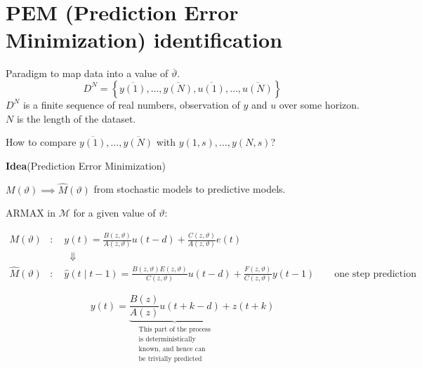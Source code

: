 \section{PEM (Prediction Error Minimization) identification}

Paradigm to map data into a value of $\overline{\vartheta}$.
$$
	D^N=\left\{\overline{y(1)},\ldots,\overline{y(N)},\overline{u(1)},\ldots,\overline{u(N)}\right\}
$$
$D^N$ is a finite sequence of real numbers, observation of $y$ and $u$ over some horizon. $N$ is the length of the dataset.


How to compare $\overline{y(1)},\ldots,\overline{y(N)}$ with $y(1,s),\ldots,y(N,s)$?


\textbf{Idea}(Prediction Error Minimization)

$M(\vartheta)\implies \hat{M}(\vartheta)$ from stochastic models to predictive models.

ARMAX in $\mathcal{M}$ for a given value of $\vartheta$:

\begin{align*}
	M(\vartheta)&:\quad y(t)=\frac{B(z, \vartheta)}{A(z, \vartheta)} u(t-d)+\frac{C(z, \vartheta)}{A(z, \vartheta)} e(t)\\
	&\qquad\Downarrow\\
	\hat{M}(\vartheta)&: \quad \hat{y}(t \mid t-1) =\frac{B(z,\vartheta) E(z,\vartheta)}{C(z,\vartheta)} u(t-d)+\frac{F(z,\vartheta)}{C(z,\vartheta)} y(t-1) \qquad \text{one step prediction}
\end{align*}


$$y(t)=\underbrace{\frac{B(z)}{A(z)} u(t+k-d)}_{\substack{\text{This part of the process}\\ 
		\text{is deterministically}\\
		\text{known, and hence can}\\
		\text{be trivially predicted}}} +z(t+k)$$
